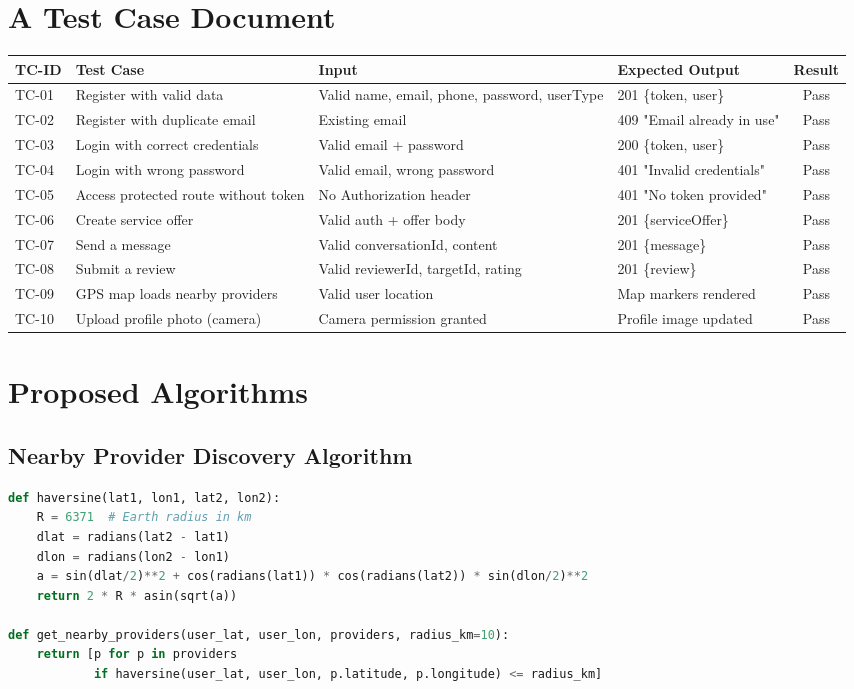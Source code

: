 \documentclass[12pt,a4paper]{report}
\begin{document}
\section{A Test Case Document}

\begin{longtable}{l p{4cm} p{4cm} p{3cm} c}
\toprule
\textbf{TC-ID} & \textbf{Test Case} & \textbf{Input} & \textbf{Expected Output} & \textbf{Result} \\
\midrule
TC-01 & Register with valid data & Valid name, email, phone, password, userType & 201 \{token, user\} & Pass \\
TC-02 & Register with duplicate email & Existing email & 409 "Email already in use" & Pass \\
TC-03 & Login with correct credentials & Valid email + password & 200 \{token, user\} & Pass \\
TC-04 & Login with wrong password & Valid email, wrong password & 401 "Invalid credentials" & Pass \\
TC-05 & Access protected route without token & No Authorization header & 401 "No token provided" & Pass \\
TC-06 & Create service offer & Valid auth + offer body & 201 \{serviceOffer\} & Pass \\
TC-07 & Send a message & Valid conversationId, content & 201 \{message\} & Pass \\
TC-08 & Submit a review & Valid reviewerId, targetId, rating & 201 \{review\} & Pass \\
TC-09 & GPS map loads nearby providers & Valid user location & Map markers rendered & Pass \\
TC-10 & Upload profile photo (camera) & Camera permission granted & Profile image updated & Pass \\
\bottomrule
\end{longtable}

\section{Proposed Algorithms}

\subsection{Nearby Provider Discovery Algorithm}

\begin{lstlisting}[language=Python, caption={Haversine-based proximity filter (conceptual)}]
def haversine(lat1, lon1, lat2, lon2):
    R = 6371  # Earth radius in km
    dlat = radians(lat2 - lat1)
    dlon = radians(lon2 - lon1)
    a = sin(dlat/2)**2 + cos(radians(lat1)) * cos(radians(lat2)) * sin(dlon/2)**2
    return 2 * R * asin(sqrt(a))

def get_nearby_providers(user_lat, user_lon, providers, radius_km=10):
    return [p for p in providers
            if haversine(user_lat, user_lon, p.latitude, p.longitude) <= radius_km]
\end{lstlisting}
\end{document}
